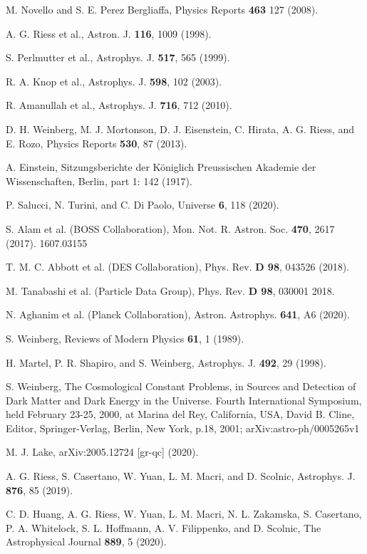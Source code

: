 \documentclass[aps,superscriptaddress, showpacs,preprintnumbers, superscriptaddress, nofootinbibt,twocolumn]{revtex4}
\begin{document}
\begin{thebibliography}{99}
 M. Novello and S. E. Perez Bergliaffa, Physics Reports {\bf 463} 127  (2008).

 A. G. Riess et al., Astron. J. \textbf{116}, 1009 (1998).

 S. Perlmutter et al., Astrophys. J. \textbf{517}, 565 (1999).

 R. A. Knop et al., Astrophys. J. \textbf{598}, 102 (2003).

 R. Amanullah et al., Astrophys. J. \textbf{716}, 712 (2010).

 D. H. Weinberg, M. J. Mortonson, D. J. Eisenstein, C. Hirata,
A. G. Riess, and E. Rozo, Physics Reports \textbf{530}, 87 (2013).

 A. Einstein, Sitzungsberichte der K\"{o}niglich Preussischen Akademie der Wissenschaften, Berlin,  part 1: 142 (1917).

 P. Salucci, N. Turini, and C. Di Paolo, Universe {\bf  6},  118 (2020).

  S. Alam et al. (BOSS Collaboration),  Mon. Not. R. Astron. Soc. {\bf 470}, 2617 (2017).
1607.03155

  T. M. C. Abbott et al. (DES Collaboration), Phys. Rev. {\bf D 98}, 043526 (2018).

 M. Tanabashi et al. (Particle Data Group),
Phys. Rev. {\bf D 98}, 030001  2018.

  N. Aghanim et al. (Planck Collaboration), Astron. Astrophys. {\bf 641}, A6 (2020).

 S. Weinberg, Reviews of Modern Physics {\bf 61}, 1 (1989).

 H. Martel, P. R. Shapiro, and S. Weinberg, Astrophys. J. {\bf 492},  29 (1998).

 S. Weinberg, The Cosmological Constant Problems, in Sources and Detection of Dark Matter and Dark Energy in the Universe. Fourth International Symposium, held February 23-25, 2000, at Marina del Rey, California, USA, David B. Cline, Editor, Springer-Verlag, Berlin, New York, p.18, 2001;  arXiv:astro-ph/0005265v1

 M. J. Lake, 	arXiv:2005.12724 [gr-qc] (2020).

 A. G. Riess, S. Casertano, W. Yuan, L. M. Macri,
and D. Scolnic,  Astrophys. J. {\bf 876}, 85 (2019).

 C. D. Huang, A. G. Riess, W. Yuan, L. M. Macri, N. L.
Zakamska, S. Casertano, P. A. Whitelock, S. L. Hoffmann, A. V. Filippenko, and D. Scolnic,
The Astrophysical Journal {\bf  889}, 5 (2020).


\end{thebibliography}
\end{document}
